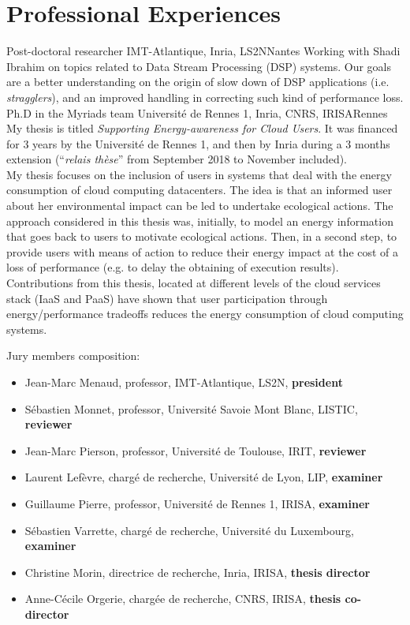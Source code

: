 \documentclass[11pt,a4paper]{moderncv}
\begin{document}
\section{Professional Experiences}
  {Post-doctoral researcher}
  {IMT-Atlantique, Inria, LS2N}{Nantes}{}
  {Working with Shadi Ibrahim on topics related to Data Stream Processing (DSP) systems. Our goals are a better understanding on the origin of slow down of DSP applications (i.e. \textit{stragglers}), and an improved handling in correcting such kind of performance loss.}
  {Ph.D in the Myriads team}
  {Université de Rennes 1, Inria, CNRS, IRISA}{Rennes}{}
  {My thesis is titled \textit{Supporting Energy-awareness for Cloud Users}. It was financed for 3 years by the Université de Rennes 1, and then by Inria during a 3 months extension (``\textit{relais thèse}'' from September 2018 to November included).\\\newline
  My thesis focuses on the inclusion of users in systems that deal with the energy consumption of cloud computing datacenters. The idea is that an informed user about her environmental impact can be led to undertake ecological actions. The approach considered in this thesis was, initially, to model an energy information that goes back to users to motivate ecological actions. Then, in a second step, to provide users with means of action to reduce their energy impact at the cost of a loss of performance (e.g. to delay the obtaining of execution results). Contributions from this thesis, located at different levels of the cloud services stack (IaaS and PaaS) have shown that user participation through energy/performance tradeoffs reduces the energy consumption of cloud computing systems.}

\cventry{}{}{}{}{}
  {\vspace{-2em}Jury members composition: 
  \begin{itemize}
    \item Jean-Marc Menaud, professor, IMT-Atlantique, LS2N, \textbf{president}
    \item Sébastien Monnet, professor, Université Savoie Mont Blanc, LISTIC, \textbf{reviewer}
    \item Jean-Marc Pierson, professor, Université de Toulouse, IRIT, \textbf{reviewer}
    \item Laurent Lefèvre, chargé de recherche, Université de Lyon, LIP, \textbf{examiner}
    \item Guillaume Pierre, professor, Université de Rennes 1, IRISA, \textbf{examiner}
    \item Sébastien Varrette, chargé de recherche, Université du Luxembourg, \textbf{examiner}
    \item Christine Morin, directrice de recherche, Inria, IRISA, \textbf{thesis director}
    \item Anne-Cécile Orgerie, chargée de recherche, CNRS, IRISA, \textbf{thesis co-director}
  \end{itemize}}
\vspace{0.6em}
\end{document}
